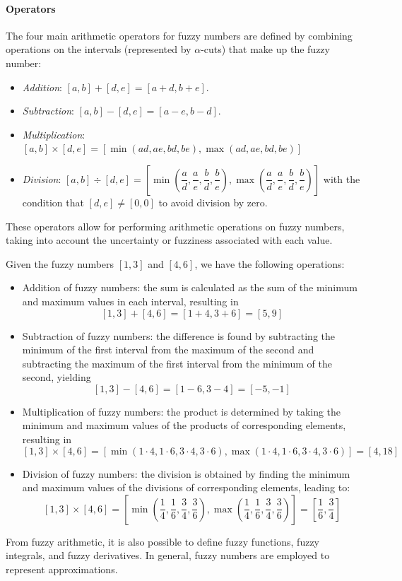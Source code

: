 \paragraph*{Operators}
The four main arithmetic operators for fuzzy numbers are defined by combining operations on the intervals (represented by $\alpha$-cuts) that make up the fuzzy number:
\begin{itemize}
    \item \textit{Addition}: $[a,b]+[d,e]=[a+d,b+e]$.
    \item \textit{Subtraction}: $[a,b]-[d,e]=[a-e,b-d]$.
    \item \textit{Multiplication}:  $[a,b] \times [d,e]=[\min (ad,ae,bd,be),\max (ad,ae,bd,be)]$
    \item \textit{Division}: $[a,b] \div [d,e]=\left[\min \left(\dfrac{a}{d},\dfrac{a}{e},\dfrac{b}{d},\dfrac{b}{e}\right),\max \left(\dfrac{a}{d},\dfrac{a}{e},\dfrac{b}{d},\dfrac{b}{e}\right)\right]$ with the condition that $[d,e] \neq [0,0]$ to avoid division by zero.
\end{itemize}
These operators allow for performing arithmetic operations on fuzzy numbers, taking into account the uncertainty or fuzziness associated with each value.
\begin{example}
    Given the fuzzy numbers $[1,3]$ and $[4,6]$, we have the following operations:
    \begin{itemize}
        \item Addition of fuzzy numbers: the sum is calculated as the sum of the minimum and maximum values in each interval, resulting in 
        \[[1,3] + [4,6] = [1+4, 3+6] = [5,9]\]
        \item Subtraction of fuzzy numbers: the difference is found by subtracting the minimum of the first interval from the maximum of the second and subtracting the maximum of the first interval from the minimum of the second, yielding 
        \[[1,3] - [4,6] = [1-6, 3-4] = [-5,-1]\]
        \item Multiplication of fuzzy numbers: the product is determined by taking the minimum and maximum values of the products of corresponding elements, resulting in 
        \[[1,3] \times [4,6] = [\min(1 \cdot 4, 1 \cdot 6, 3 \cdot 4, 3 \cdot 6), \max(1 \cdot 4, 1 \cdot 6, 3 \cdot 4, 3 \cdot 6)] = [4,18]\]
        \item Division of fuzzy numbers: the division is obtained by finding the minimum and maximum values of the divisions of corresponding elements, leading to:
        \[[1,3] \times [4,6]=\left[\min\left(\dfrac{1}{4}, \dfrac{1}{6}, \dfrac{3}{4}, \dfrac{3}{6}\right),\max\left(\dfrac{1}{4}, \dfrac{1}{6}, \dfrac{3}{4}, \dfrac{3}{6}\right)\right]=\left[\dfrac{1}{6},\dfrac{3}{4}\right]\]
    \end{itemize}
\end{example}
From fuzzy arithmetic, it is also possible to define fuzzy functions, fuzzy integrals, and fuzzy derivatives. 
In general, fuzzy numbers are employed to represent approximations.
